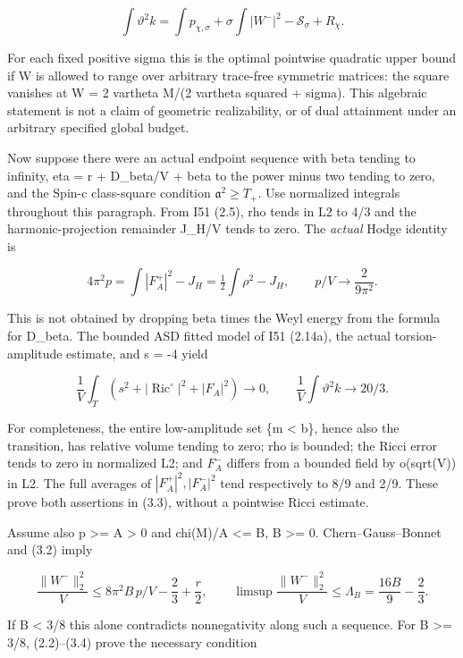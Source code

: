 \documentclass[
  10pt,
]{article}
\begin{document}
\[
 \boxed{\int\vartheta^2k
    =\int p_{\chi,\sigma}+\sigma\int|W^-|^2
                                  -\mathcal S_\sigma+R_\chi.}   \tag{3.1}
\]

For each fixed positive sigma this is the optimal pointwise quadratic
upper bound if W is allowed to range over arbitrary trace-free symmetric
matrices: the square vanishes at W = 2 vartheta M/(2 vartheta squared +
sigma). This algebraic statement is not a claim of geometric
realizability, or of dual attainment under an arbitrary specified global
budget.

Now suppose there were an actual endpoint sequence with beta tending to
infinity, eta = r + D\_beta/V + beta to the power minus two tending to
zero, and the Spin-c class-square condition \(\mathfrak a^2\ge T_+\).
Use normalized integrals throughout this paragraph. From I51 (2.5), rho
tends in L2 to 4/3 and the harmonic-projection remainder J\_H/V tends to
zero. The \emph{actual} Hodge identity is

\[
 4\pi^2p=\int|F_A^+|^2-J_H=\tfrac12\int\rho^2-J_H,
 \qquad p/V\longrightarrow\frac2{9\pi^2}.                \tag{3.2}
\]

This is not obtained by dropping beta times the Weyl energy from the
formula for D\_beta. The bounded ASD fitted model of I51 (2.14a), the
actual torsion-amplitude estimate, and s = -4 yield

\[
 \frac1V\int_T(s^2+|\operatorname{Ric}^{\circ}|^2+|F_A|^2)\to0,
 \qquad
 \frac1V\int\vartheta^2k\to20/3.                         \tag{3.3}
\]

For completeness, the entire low-amplitude set \{m \textless{} b\},
hence also the transition, has relative volume tending to zero; rho is
bounded; the Ricci error tends to zero in normalized L2; and \(F_A^-\)
differs from a bounded field by o(sqrt(V)) in L2. The full averages of
\(|F_A^+|^2,|F_A^-|^2\) tend respectively to 8/9 and 2/9. These prove
both assertions in (3.3), without a pointwise Ricci estimate.

Assume also p \textgreater= A \textgreater{} 0 and chi(M)/A \textless=
B, B \textgreater= 0. Chern--Gauss--Bonnet and (3.2) imply

\[
 \frac{\|W^-\|_2^2}{V}
 \le8\pi^2B\,p/V-\frac23+\frac r2,\qquad
 \limsup\frac{\|W^-\|_2^2}{V}\le
                          \Lambda_B=\frac{16B}{9}-\frac23.     \tag{3.4}
\]

If B \textless{} 3/8 this alone contradicts nonnegativity along such a
sequence. For B \textgreater= 3/8, (2.2)--(3.4) prove the necessary
condition
\end{document}
